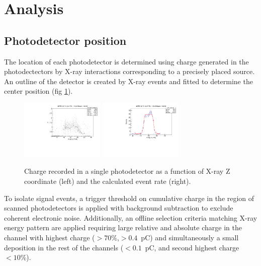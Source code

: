 \section{Analysis}

\subsection{Photodetector position} \label{mppcposition}
The location of each photodetector is determined using charge
generated in the photodectectors by X-ray interactions corresponding
to a precisely placed source.  An outline of the detector is created
by X-ray events and fitted to determine the center position (fig
\ref{fig:xraycharge}). 

\begin{figure}[h]
  \includegraphics[width=4cm]{plots/2018/hcharge67_z}
  \includegraphics[width=4cm]{plots/2018/mppc_fit}
  \caption{Charge recorded in a single photodetector as a function of X-ray Z coordinate 
  (left) and 
    the calculated event rate (right).}
  \label{fig:xraycharge}
\end{figure}  

To isolate signal events, a trigger threshold on cumulative charge 
in the region of scanned photodetectors is applied with background 
subtraction to exclude coherent electronic noise. Additionally, 
an offline selection criteria matching X-ray energy pattern are applied
requiring large relative and absolute charge in the channel with highest charge
($>70\%$,$>0.4$~pC) and simultaneously a small deposition 
in the rest of the channels ($<0.1$~pC, and second highest charge$<10\%$).

